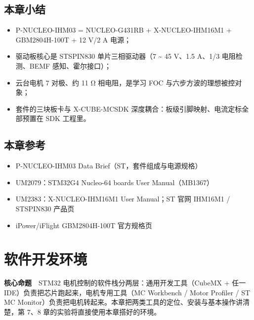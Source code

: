 \documentclass[
  UTF8,
  scheme=plain,
  fontsize=10pt,
  openany
]{ctexbook}
\begin{document}
\section{本章小结}\label{ux672cux7ae0ux5c0fux7ed3-1}

\begin{itemize}
\tightlist
\item
  P-NUCLEO-IHM03 = NUCLEO-G431RB + X-NUCLEO-IHM16M1 + GBM2804H-100T + 12
  V/2 A 电源；
\item
  驱动板核心是 STSPIN830 单片三相驱动器（7 \textasciitilde{} 45 V、1.5
  A、1/3 电阻检测、BEMF 感知、霍尔接口）；
\item
  云台电机 7 对极、约 11 Ω 相电阻，是学习 FOC 与六步方波的理想被控对象；
\item
  套件的三块板卡与 X-CUBE-MCSDK
  深度耦合：板级引脚映射、电流定标全部预置在 SDK 工程里。
\end{itemize}

\section{本章参考}\label{ux672cux7ae0ux53c2ux8003-1}

\begin{itemize}
\tightlist
\item
  P-NUCLEO-IHM03 Data Brief（ST，套件组成与电源规格）
\item
  UM2079：STM32G4 Nucleo-64 boards User Manual（MB1367）
\item
  UM2383：X-NUCLEO-IHM16M1 User Manual；ST 官网 IHM16M1 / STSPIN830
  产品页
\item
  iPower/iFlight GBM2804H-100T 官方规格页
\end{itemize}

\clearpage

\chapter{软件开发环境}\label{ux8f6fux4ef6ux5f00ux53d1ux73afux5883}

\begin{epigraph}

\textbf{核心命题}　STM32 电机控制的软件栈分两层：通用开发工具（CubeMX +
任一 IDE）负责把芯片跑起来，电机专用工具（MC Workbench / Motor Profiler
/ ST MC
Monitor）负责把电机转起来。本章把两类工具的定位、安装与基本操作讲清楚，第
7、8 章的实验将直接使用本章搭好的环境。

\end{epigraph}
\end{document}
